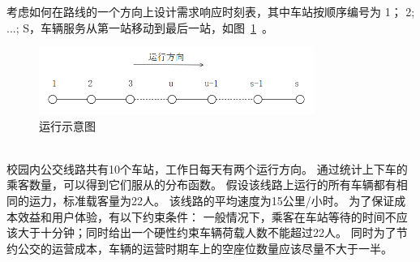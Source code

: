 考虑如何在路线的一个方向上设计需求响应时刻表，其中车站按顺序编号为 1；
2; ...; S，车辆服务从第一站移动到最后一站，如图~\ref{fig42}~。
\\
\begin{figure}[htbp]
    \centering
    \includegraphics[width=0.8\textwidth]{figs/chap03/a.png}
    \caption{运行示意图}
    \label{fig42}
\end{figure}
\\

校园内公交线路共有10个车站，工作日每天有两个运行方向。
通过统计上下车的乘客数量，可以得到它们服从的分布函数。
假设该线路上运行的所有车辆都有相同的运力，标准载客量为22人。
该线路的平均速度为15公里/小时。
为了保证成本效益和用户体验，有以下约束条件：
一般情况下，乘客在车站等待的时间不应该大于十分钟；同时给出一个硬性约束车辆荷载人数不能超过22人。
同时为了节约公交的运营成本，车辆的运营时期车上的空座位数量应该尽量不大于一半。




